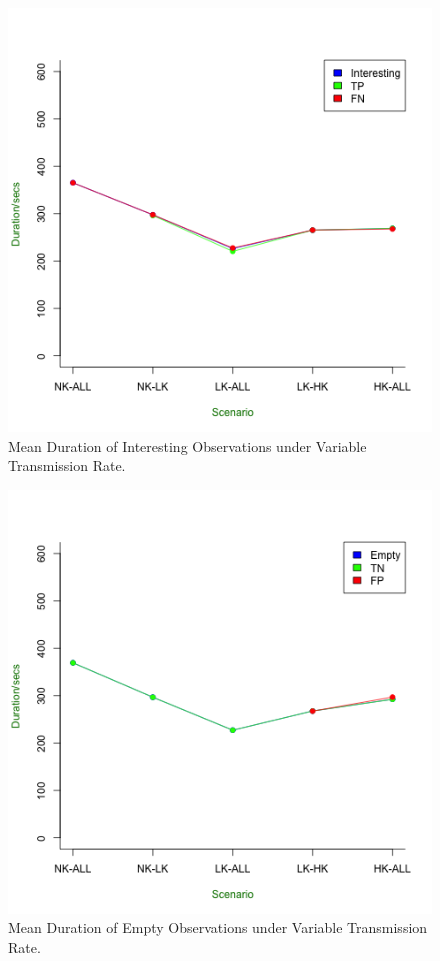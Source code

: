     \begin{figure}[h]
	\centering
	\includegraphics[width=\textwidth]{Chap7/figures/real_int_dur}
	\caption{Mean Duration of Interesting Observations under Variable Transmission Rate.}
	\label{fig:real:int:dur}
	\end{figure}	

	\begin{figure}[h]
	\centering
	\includegraphics[width=\textwidth]{Chap7/figures/real_empty_dur}
	\caption{Mean Duration of Empty Observations under Variable Transmission Rate.}
	\label{fig:real:empty:dur}
	\end{figure}	

